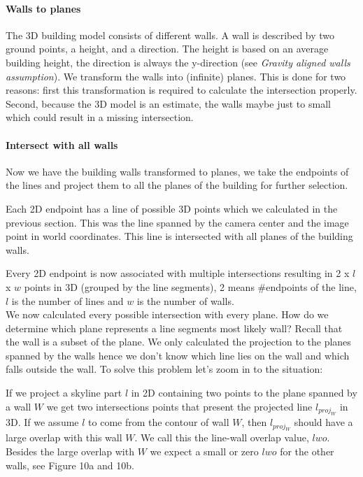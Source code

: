 	\paragraph{Walls to planes}
	The 3D building model consists of different walls. A wall is described by
	two ground points, a height, and a direction.
	The height is based on an average building height, the direction is always the
	y-direction (see \emph{Gravity aligned walls assumption}). We transform the walls into (infinite) planes.  This is done for two
	reasons: first this transformation is required to calculate the intersection
	properly. Second, because the 3D model is an estimate, the walls maybe just
	to small which could result in a missing intersection. \\


	\paragraph{Intersect with all walls}
	Now we have the building walls transformed to planes, we take the endpoints of the
	lines and project them to all the planes of the building for further
	selection.  

	Each 2D endpoint has a line of possible 3D points which we calculated in the
	previous section. This was the line spanned by the camera center and the
	image point in world coordinates.
	This line is intersected with all planes of the building walls. 
	
	Every 2D endpoint is now associated with multiple intersections resulting in 2 x
	$l$ x $w$ points in 3D (grouped by the line segments), 2 means
	\#endpoints of the line, $l$ is the number of lines and $w$ is the number of
	walls.\\

	We now calculated every possible intersection with every plane. How do we
	determine which plane represents a line segments most likely wall?  
	Recall that the wall is a subset of the plane.  We only calculated the projection to the
	planes spanned by the walls hence we don't know which line lies on
	the wall and which falls outside the wall. To solve this problem let's
	zoom in to the situation:

	If we project a skyline part $l$ in 2D containing two points to the plane spanned
	by a wall $W$ we get two intersections points that present the projected
	line $l_{proj_W}$ in 3D. If we assume
	$l$ to come from the contour of wall $W$, then $l_{proj_W}$ should have a large
	overlap with this wall $W$.  We call this the line-wall overlap value, $lwo$.  
	Besides the large overlap with $W$ we expect a small or zero $lwo$ for
	the other walls, see Figure 10a and 10b.\\

